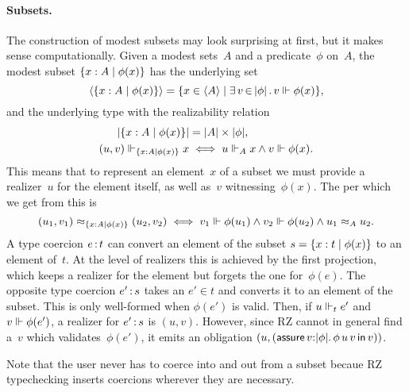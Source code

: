 \paragraph{Subsets.}
%
The construction of modest subsets may look surprising at first, but
it makes sense computationally. Given a modest sets~$A$ and a
predicate~$\phi$ on~$A$, the modest subset $\{x : A \mid \phi(x)\}$
has the underlying set
%
\begin{equation*}
  \langle \{x : A \mid \phi(x)\} \rangle =
  \{x \in \langle A \rangle \mid \exists\, v \,{\in}\, |\phi|\,.\,v \Vdash \phi(x)\},
\end{equation*}
%
and the underlying type with the realizability relation
%
\begin{align*}
  |\{x : A \mid \phi(x)\}| &= |A| \times
  |\phi|,\\
  (u,v) \Vdash_{\{x : A \mid \phi(x)\}} x &\iff
  u \Vdash_A x \land v \Vdash \phi(x).
\end{align*}
%
This means that to represent an element~$x$ of a subset we must
provide a realizer~$u$ for the element itself, as well as~$v$
witnessing~$\phi(x)$. The per which we get from this is
%
\begin{equation*}
  (u_1, v_1) \approx_{\{x : A \mid \phi(x)\}} (u_2, v_2) \iff
  v_1 \Vdash \phi(u_1) \land v_2 \Vdash \phi(u_2) \land
  u_1 \approx_A u_2.
\end{equation*}
%
A type coercion $e\,{:}\,t$ can convert an element of the subset $s =
\{x : t \mid \phi(x)\}$ to an element of~$t$. At the level of
realizers this is achieved by the first projection, which keeps a
realizer for the element but forgets the one for~$\phi(e)$. The
opposite type coercion $e'\,{:}\,s$ takes an $e' \in t$ and converts it
to an element of the subset. This is only well-formed when $\phi(e')$
is valid. Then, if $u \Vdash_t e'$ and $v \Vdash \phi(e')$, a realizer for
$e'\,{:}\,s$ is $(u, v)$. However, since RZ cannot in general find
a~$v$ which validates~$\phi(e')$, it emits an obligation $(u,
(\mathsf{assure}\,v{:}|\phi|.\,\phi\,u\,v\,\mathsf{in}\,v))$.

Note that the user never has to coerce into and out from a subset
becaue RZ typechecking inserts coercions wherever they are necessary.

